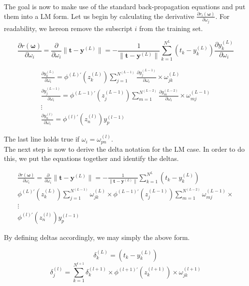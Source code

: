 \documentclass[a4paper,10pt]{article}
\theoremstyle{definition}
\begin{document}
The goal is now to make use of the standard back-propagation equations and put them into a LM form. Let us begin by calculating the derivative $\frac{\partial r_i(\pmb{\omega})}{\partial \omega_j}$. For readability, we hereon remove the subscript $i$ from the training set.

\begin{equation}
	\frac{\partial r(\pmb{\omega})}{\partial \omega_i} = \frac{\partial}{\partial \omega_i}\parallel \pmb{t} - \pmb{y}^{(L)}\parallel = -\frac{1}{\parallel \pmb{t} - \pmb{y}^{(L)}\parallel} \sum_{k = 1}^{N^L}(t_k - y^{(L)}_k)\frac{\partial y^{(L)}_k}{\partial \omega_i}
\end{equation}

\begin{gather*}
	\frac{\partial y^{(L)}_k}{\partial \omega_i} = \phi^{(L)'}(z^{(L)}_k) \sum_{j=1}^{N^{(L-1)}} \frac{\partial y^{(L-1)}_j}{\partial \omega_i} \times \omega^{(L)}_{jk} \\
	\frac{\partial y^{(L-1)}_j}{\partial \omega_i} = \phi^{(L-1)'}(z^{(L-1)}_j) \sum_{m=1}^{N^{(L-2)}} \frac{\partial y^{(L-2)}_m}{\partial \omega_i} \times \omega^{(L-1)}_{mj}\\
	\vdots \\
	\frac{\partial y^{(l)}_n}{\partial \omega_i} = \phi^{(l)'}(z^{(l)}_n) y^{(l-1)}_p
\end{gather*}

The last line holds true if $\omega_i = \omega^{(l)}_{pn}$. \\

The next step is now to derive the delta notation for the LM case. In order to do this, we put the equations together and identify the deltas.

\begin{gather*}
	\frac{\partial r(\pmb{\omega})}{\partial \omega_i} = \frac{\partial}{\partial \omega_i}\parallel \pmb{t} - \pmb{y}^{(L)}\parallel = -\frac{1}{\parallel \pmb{t} - \pmb{y}^{(L)}\parallel} \sum_{k = 1}^{N^L}(t_k - y^{(L)}_k)\\
	\phi^{(L)'}(z^{(L)}_k) \sum_{j=1}^{N^{(L-1)}} \omega^{(L)}_{jk} \times \phi^{(L-1)'}(z^{(L-1)}_j) \sum_{m=1}^{N^{(L-2)}} \omega^{(L-1)}_{mj} \times\\
	\vdots\\
	\phi^{(l)'}(z^{(l)}_n) y^{(l-1)}_p
\end{gather*}

By defining deltas accordingly, we may simply the above form.

\begin{equation}
	\delta^{(L)}_k = (t_k - y^{(L)}_k)
\end{equation}
\begin{equation}
	\delta^{(l)}_j = \sum_{k=1}^{N^{l+1}} \delta^{(l+1)}_k \times \phi^{(l+1)'}(z^{(l+1)}_k) \times \omega^{(l+1)}_{jk}
\end{equation}
\end{document}
